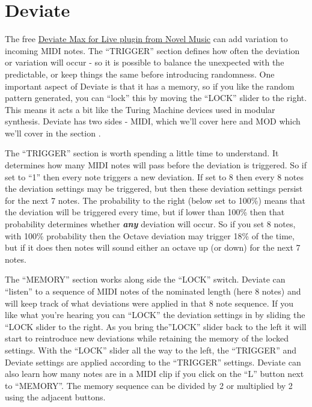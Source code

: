 \documentclass[
  12pt,
  letterpaper,
  oneside,
  open=any]{scrbook}
\makeatletter
\newcommand*\pandocbounded[1]{%
  \sbox\pandoc@box{#1}%
  \Gscale@div\@tempa{\textheight}{\dimexpr\ht\pandoc@box+\dp\pandoc@box\relax}%
  \Gscale@div\@tempb{\linewidth}{\wd\pandoc@box}%
  \ifdim\@tempb\p@<\@tempa\p@\let\@tempa\@tempb\fi%
  \ifdim\@tempa\p@<\p@\scalebox{\@tempa}{\usebox\pandoc@box}%
  \else\usebox{\pandoc@box}%
  \fi%
}
\makeatother
\begin{document}
\pandocbounded{\texttt{[image: images/Probability\_Gate.png]}}

\section{Deviate}\label{deviate}

The free \href{https://www.novelmusic.org/m4l/deviate}{Deviate Max for
Live plugin from Novel Music} can add variation to incoming MIDI notes.
The ``TRIGGER'' section defines how often the deviation or variation
will occur - so it is possible to balance the unexpected with the
predictable, or keep things the same before introducing randomness. One
important aspect of Deviate is that it has a memory, so if you like the
random pattern generated, you can ``lock'' this by moving the ``LOCK''
slider to the right. This means it acts a bit like the Turing Machine
devices used in modular synthesis. Deviate has two sides - MIDI, which
we'll cover here and MOD which we'll cover in the section .

The ``TRIGGER'' section is worth spending a little time to understand.
It determines how many MIDI notes will pass before the deviation is
triggered. So if set to ``1'' then every note triggers a new deviation.
If set to 8 then every 8 notes the deviation settings may be triggered,
but then these deviation settings persist for the next 7 notes. The
probability to the right (below set to 100\%) means that the deviation
will be triggered every time, but if lower than 100\% then that
probability determines whether \textbf{\emph{any}} deviation will occur.
So if you set 8 notes, with 100\% probability then the Octave deviation
may trigger 18\% of the time, but if it does then notes will sound
either an octave up (or down) for the next 7 notes.

The ``MEMORY'' section works along side the ``LOCK'' switch. Deviate can
``listen'' to a sequence of MIDI notes of the nominated length (here 8
notes) and will keep track of what deviations were applied in that 8
note sequence. If you like what you're hearing you can ``LOCK'' the
deviation settings in by sliding the ``LOCK slider to the right. As you
bring the''LOCK'' slider back to the left it will start to reintroduce
new deviations while retaining the memory of the locked settings. With
the ``LOCK'' slider all the way to the left, the ``TRIGGER'' and Deviate
settings are applied according to the ``TRIGGER'' settings. Deviate can
also learn how many notes are in a MIDI clip if you click on the ``L''
button next to ``MEMORY''. The memory sequence can be divided by 2 or
multiplied by 2 using the adjacent buttons.
\end{document}
